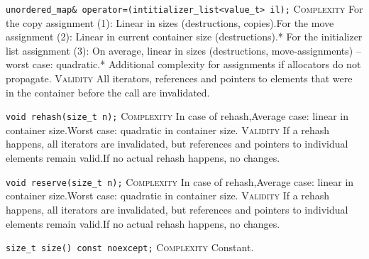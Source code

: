 \noindent{}\hspace*{0.25em}\lstinline[basicstyle=\ttfamily\color{corange}]{unordered_map& operator=(intitializer_list<value_t> il);} \textsc{Complexity} For the copy assignment (1): Linear in sizes (destructions, copies).For the move assignment (2): Linear in current container size (destructions).* For the initializer list assignment (3): On average, linear in sizes (destructions, move-assignments) -- worst case: quadratic.* Additional complexity for assignments if allocators do not propagate. \textsc{Validity} All iterators, references and pointers to elements that were in the container before the call are invalidated.\\\vspace{-0.6em}

\noindent{}\hspace*{0.25em}\lstinline[basicstyle=\ttfamily\color{corange}]{void rehash(size_t n);} \textsc{Complexity} In case of rehash,Average case: linear in container size.Worst case: quadratic in container size. \textsc{Validity} If a rehash happens, all iterators are invalidated, but references and pointers to individual elements remain valid.If no actual rehash happens, no changes.\\\vspace{-0.6em}

\noindent{}\hspace*{0.25em}\lstinline[basicstyle=\ttfamily\color{corange}]{void reserve(size_t n);} \textsc{Complexity} In case of rehash,Average case: linear in container size.Worst case: quadratic in container size. \textsc{Validity} If a rehash happens, all iterators are invalidated, but references and pointers to individual elements remain valid.If no actual rehash happens, no changes.\\\vspace{-0.6em}

\noindent{}\hspace*{0.25em}\lstinline[basicstyle=\ttfamily\color{cgreen}]{size_t size() const noexcept;} \textsc{Complexity} Constant.\\\vspace{-0.6em}

